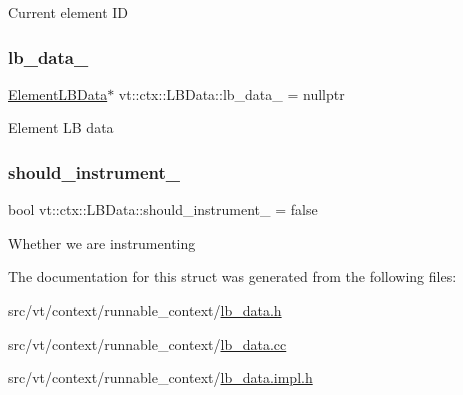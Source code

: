Current element ID \mbox{\label{structvt_1_1ctx_1_1_l_b_data_a766b2b0aa69889fc3e397c7bfbb0b68a}} 
\subsubsection{\texorpdfstring{lb\+\_\+data\+\_\+}{lb\_data\_}}
{\footnotesize\ttfamily \hyperlink{structvt_1_1ctx_1_1_l_b_data_a11f1aeb75c01ae0c77d96f94ce1994bb}{Element\+L\+B\+Data}$\ast$ vt\+::ctx\+::\+L\+B\+Data\+::lb\+\_\+data\+\_\+ = nullptr\hspace{0.3cm}{\ttfamily [private]}}

Element LB data \mbox{\label{structvt_1_1ctx_1_1_l_b_data_a0f36387b1ed5d20e39b72e97251e0efc}} 
\subsubsection{\texorpdfstring{should\+\_\+instrument\+\_\+}{should\_instrument\_}}
{\footnotesize\ttfamily bool vt\+::ctx\+::\+L\+B\+Data\+::should\+\_\+instrument\+\_\+ = false\hspace{0.3cm}{\ttfamily [private]}}

Whether we are instrumenting 

The documentation for this struct was generated from the following files\+:\begin{DoxyCompactItemize}
\item 
src/vt/context/runnable\+\_\+context/\hyperlink{lb__data_8h}{lb\+\_\+data.\+h}\item 
src/vt/context/runnable\+\_\+context/\hyperlink{lb__data_8cc}{lb\+\_\+data.\+cc}\item 
src/vt/context/runnable\+\_\+context/\hyperlink{lb__data_8impl_8h}{lb\+\_\+data.\+impl.\+h}\end{DoxyCompactItemize}
